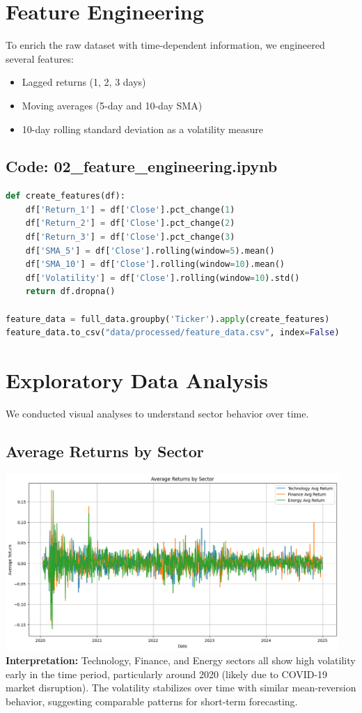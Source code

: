 \documentclass[12pt]{article}
\begin{document}
\section{Feature Engineering}
To enrich the raw dataset with time-dependent information, we engineered several features:
\begin{itemize}
  \item Lagged returns (1, 2, 3 days)
  \item Moving averages (5-day and 10-day SMA)
  \item 10-day rolling standard deviation as a volatility measure
\end{itemize}

\subsection*{Code: 02\_feature\_engineering.ipynb}
\begin{lstlisting}[language=Python]
def create_features(df):
    df['Return_1'] = df['Close'].pct_change(1)
    df['Return_2'] = df['Close'].pct_change(2)
    df['Return_3'] = df['Close'].pct_change(3)
    df['SMA_5'] = df['Close'].rolling(window=5).mean()
    df['SMA_10'] = df['Close'].rolling(window=10).mean()
    df['Volatility'] = df['Close'].rolling(window=10).std()
    return df.dropna()

feature_data = full_data.groupby('Ticker').apply(create_features)
feature_data.to_csv("data/processed/feature_data.csv", index=False)
\end{lstlisting}

\section{Exploratory Data Analysis}
We conducted visual analyses to understand sector behavior over time.

\subsection{Average Returns by Sector}
\includegraphics[width=0.95\textwidth]{avg_returns_by_sector.png}
\textbf{Interpretation:} Technology, Finance, and Energy sectors all show high volatility early in the time period, particularly around 2020 (likely due to COVID-19 market disruption). The volatility stabilizes over time with similar mean-reversion behavior, suggesting comparable patterns for short-term forecasting.
\end{document}
